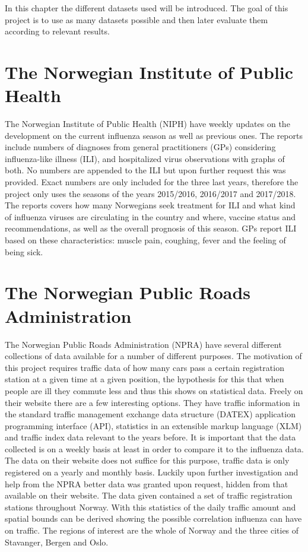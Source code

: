 In this chapter the different datasets used will be introduced. The goal of this project is to use as many datasets possible and then later evaluate them according to relevant results.

\section{The Norwegian Institute of Public Health}
The Norwegian Institute of Public Health (NIPH) have weekly updates\cite{fhi} on the development on the current influenza season as well as previous ones. The reports include numbers of diagnoses from general practitioners (GPs) considering influenza-like illness (ILI), and hospitalized virus observations with graphs of both. No numbers are appended to the ILI but upon further request this was provided. Exact numbers are only included for the three last years, therefore the project only uses the seasons of the years 2015/2016, 2016/2017 and 2017/2018. The reports covers how many Norwegians seek treatment for ILI and what kind of influenza viruses are circulating in the country and where, vaccine status and recommendations, as well as the overall prognosis of this season. GPs report ILI based on these characteristics: muscle pain, coughing, fever and the feeling of being sick.

\section{The Norwegian Public Roads Administration}
The Norwegian Public Roads Administration (NPRA) have several different collections of data available for a number of different purposes. The motivation of this project requires traffic data of how many cars pass a certain registration station at a given time at a given position, the hypothesis for this that when people are ill they commute less and thus this shows on statistical data. Freely on their website \cite{vegvesenet} there are a few interesting options. They have traffic information in the standard traffic management exchange data structure (DATEX) application programming interface (API), statistics in an extensible markup language (XLM) and traffic index data relevant to the years before. It is important that the data collected is on a weekly basis at least in order to compare it to the influenza data. The data on their website does not suffice for this purpose, traffic data is only registered on a yearly and monthly basis. Luckily upon further investigation and help from the NPRA better data was granted upon request, hidden from that available on their website. The data given contained a set of traffic registration stations throughout Norway. With this statistics of the daily traffic amount and spatial bounds can be derived showing the possible correlation influenza can have on traffic. The regions of interest are the whole of Norway and the three cities of Stavanger, Bergen and Oslo.

